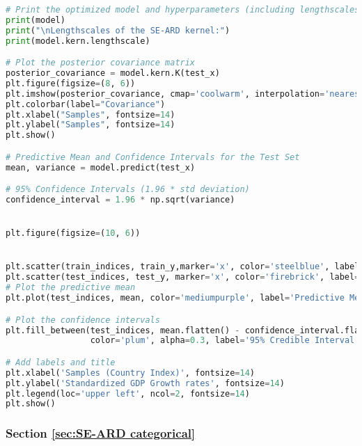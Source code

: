 \documentclass[12pt,a4paper]{article}
\begin{document}
\begin{lstlisting}[language=python, caption={Code of the Creation of Figures\ref{fig:SE-ARD barro dataset plot},\ref{fig:SE-ARD barro correlation (test) plot}, \ref{fig:SE-ARD barro GPregression plot}}]
# Print the optimized model and hyperparameters (including lengthscales)
print(model)
print("\nLengthscales of the SE-ARD kernel:")
print(model.kern.lengthscale)

# Plot the posterior covariance matrix
posterior_covariance = model.kern.K(test_x)
plt.figure(figsize=(8, 6))
plt.imshow(posterior_covariance, cmap='coolwarm', interpolation='nearest')
plt.colorbar(label="Covariance")
plt.xlabel("Samples", fontsize=14)
plt.ylabel("Samples", fontsize=14)
plt.show()

# Predictive Mean and Confidence Intervals for the Test Set
mean, variance = model.predict(test_x)

# 95% Confidence Intervals (1.96 * std deviation)
confidence_interval = 1.96 * np.sqrt(variance)


plt.figure(figsize=(10, 6))


plt.scatter(train_indices, train_y,marker='x', color='steelblue', label='Training Data', s=50)
plt.scatter(test_indices, test_y, marker='x', color='firebrick', label='Test Data', s=50)
# Plot the predictive mean
plt.plot(test_indices, mean, color='mediumpurple', label='Predictive Mean', linewidth=3)

# Plot the confidence intervals
plt.fill_between(test_indices, mean.flatten() - confidence_interval.flatten(), mean.flatten() + confidence_interval.flatten(),
                 color='plum', alpha=0.3, label='95% Credible Interval')

# Add labels and title
plt.xlabel('Samples (Country Index)', fontsize=14)
plt.ylabel('Standardized GDP Growth rates', fontsize=14)
plt.legend(loc='upper left', ncol=2, fontsize=14)
plt.show()
\end{lstlisting}

\subsubsection{Section \ref{sec:SE-ARD categorical}}
\end{document}
